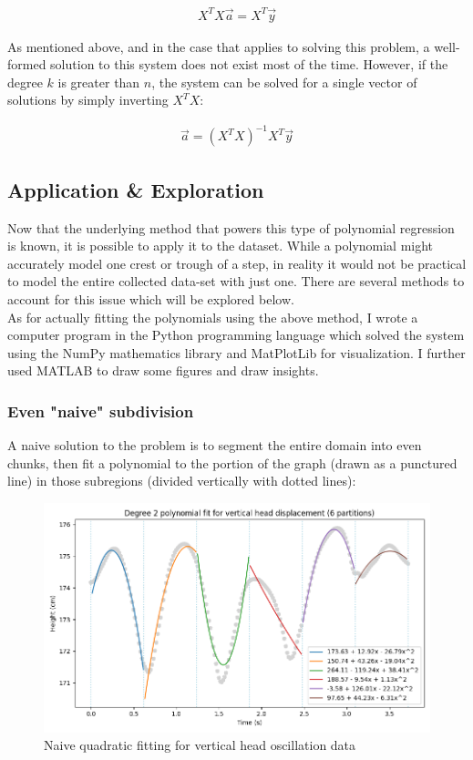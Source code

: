 \documentclass[12pt, a4paper]{article}
\begin{document}
\begin{align*}
    X^TX\vec{a}=X^T\vec{y}
\end{align*}

As mentioned above, and in the case that applies to solving this problem, a
well-formed solution to this system does not exist most of the time. However, if
the degree $k$ is greater than $n$, the system can be solved for a single vector
of solutions by simply inverting $X^TX$:

\begin{align*}
    \vec{a}=(X^TX)^{-1}X^T\vec{y}
\end{align*}

\subsection{Application \& Exploration}
Now that the underlying method that powers this type of polynomial regression is
known, it is possible to apply it to the dataset. While a polynomial might
accurately model one crest or trough of a step, in reality it would not be
practical to model the entire collected data-set with just one. There are
several methods to account for this issue which will be explored below. \\

As for actually fitting the polynomials using the above method, I wrote a
computer program in the Python programming language which solved the system
using the NumPy mathematics library and MatPlotLib for visualization. I further
used MATLAB to draw some figures and draw insights.

\subsubsection{Even "naive" subdivision}
\label{section_naive_seg}
A naive solution to the problem is to segment the entire domain into even
chunks, then fit a polynomial to the portion of the graph (drawn as a punctured
line) in those subregions (divided vertically with dotted lines):

\begin{figure}[H]
    \centering
    \includegraphics[width=12cm]{p_naive_head_2.png}
    \caption{Naive quadratic fitting for vertical head oscillation data}
    \label{naive_head}
\end{figure}
\end{document}
